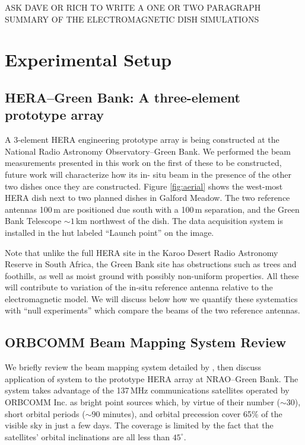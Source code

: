 \documentclass{emulateapj}
\begin{document}
ASK DAVE OR RICH TO WRITE A ONE OR TWO PARAGRAPH SUMMARY OF THE ELECTROMAGNETIC DISH SIMULATIONS

\section{Experimental Setup}

\subsection{HERA--Green Bank: A three-element prototype array}


A 3-element HERA engineering prototype array is being constructed at the National Radio 
Astronomy Observatory--Green Bank. We performed the beam measurements presented in 
this work on the first of these to be constructed, future work will characterize how its in-
situ beam in the presence of the other two dishes once they are constructed. Figure 
\ref{fig:aerial} shows the west-most HERA dish next to two planned dishes in Galford 
Meadow. The two reference antennas 100\,m are positioned due south with a 100\,m 
separation, and the Green Bank Telescope $\sim1$\,km northwest of the dish. The data 
acquisition system is installed in the hut labeled ``Launch point'' on the image. 

Note that unlike the full HERA site in the Karoo Desert Radio Astronomy Reserve in 
South Africa, the Green Bank site has obstructions such as trees and foothills, as well as 
moist ground with possibly non-uniform properties. All these will contribute to variation 
of the in-situ reference antenna relative to the electromagnetic model. We will discuss 
below how we quantify these systematics with ``null experiments'' which compare the 
beams of the two reference antennas.

\subsection{ORBCOMM Beam Mapping System Review}

We briefly review the beam mapping system detailed by \citet{neben15}, then discuss 
application of system to the prototype HERA array at NRAO--Green Bank. The system 
takes advantage of the 137\,MHz communications satellites operated by ORBCOMM Inc. 
as bright point sources which, by virtue of their number ($\sim30$), short orbital periods 
($\sim90$ minutes), and orbital precession cover 65\% of the visible sky in just a few 
days. The coverage is limited by the fact that the satellites' orbital inclinations are all less 
than $45^\circ$. 
\end{document}
